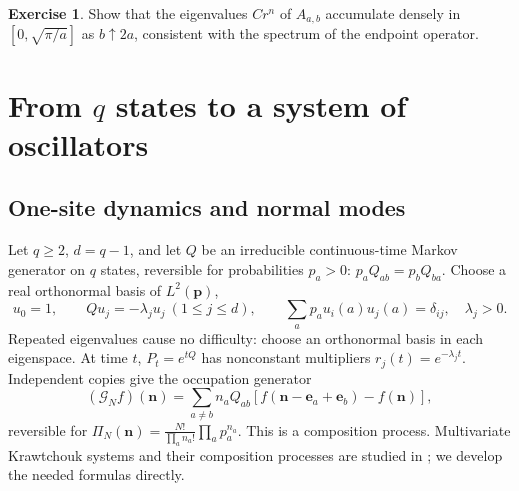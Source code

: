 \documentclass[11pt,reqno]{amsart}
\theoremstyle{definition}
\newtheorem{exercise}[theorem]{Exercise}
\theoremstyle{remark}
\begin{document}
\begin{exercise}
Show that the eigenvalues $Cr^n$ of $A_{a,b}$ accumulate densely in
$[0,\sqrt{\pi/a}]$ as $b\uparrow2a$, consistent with the spectrum of
the endpoint operator.
\end{exercise}


\section{From $q$ states to a system of oscillators}\label{L:multi}
\subsection{One-site dynamics and normal modes}
Let $q\ge2$, $d=q-1$, and let $Q$ be an irreducible continuous-time
Markov generator on $q$ states, reversible for probabilities $p_a>0$:
$p_aQ_{ab}=p_bQ_{ba}$. Choose a real orthonormal basis of $L^2(\mathbf p)$,
\begin{equation}\label{eq:modes}
u_0=1,\qquad Qu_j=-\lambda_ju_j\ (1\le j\le d),\qquad
\sum_ap_au_i(a)u_j(a)=\delta_{ij},\quad\lambda_j>0.
\end{equation}
Repeated eigenvalues cause no difficulty: choose an orthonormal basis
in each eigenspace. At time $t$, $P_t=e^{tQ}$ has nonconstant
multipliers $r_j(t)=e^{-\lambda_jt}$. Independent copies give the
occupation generator
\begin{equation}\label{eq:compgen}
(\mathcal G_Nf)(\mathbf n)=\sum_{a\ne b}n_aQ_{ab}
[f(\mathbf n-\mathbf e_a+\mathbf e_b)-f(\mathbf n)],
\end{equation}
reversible for $\Pi_N(\mathbf n)=\frac{N!}{\prod_an_a!}\prod_ap_a^{n_a}$.
This is a composition process. Multivariate Krawtchouk systems and their
composition processes are studied in \cite{Griffiths1971,Griffiths2016};
we develop the needed formulas directly.
\end{document}
